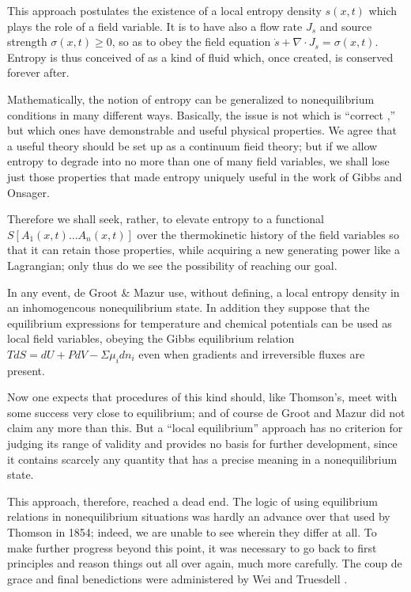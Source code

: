 \documentclass{article}
\begin{document}
This approach postulates the existence of a local entropy density $s(x, t)$ which plays the role of a field variable. It is to have also a flow rate $J_s$ and source strength $\sigma(x, t) \geqslant 0$, so as to obey the field equation $\dot{s}+\nabla \cdot J_s=\sigma(x, t)$. Entropy is thus conceived of as a kind of fluid which, once created, is conserved forever after.

Mathematically, the notion of entropy can be generalized to nonequilibrium conditions in many different ways. Basically, the issue is not which is ``correct ,'' but which ones have demonstrable and useful physical properties. We agree that a useful theory should be set up as a continuum fieid theory; but if we allow entropy to degrade into no more than one of many field variables, we shall lose just those properties that made entropy uniquely useful in the work of Gibbs and Onsager.

Therefore we shall seek, rather, to elevate entropy to a functional $S\left[A_1(x, t) \ldots A_n(x, t)\right]$ over the thermokinetic history of the field variables so that it can retain those properties, while acquiring a new generating power like a Lagrangian; only thus do we see the possibility of reaching our goal.

In any event, de Groot \& Mazur use, without defining, a local entropy density in an inhomogencous nonequilibrium state. In addition they suppose that the equilibrium expressions for temperature and chemical potentials can be used as local field variables, obeying the Gibbs equilibrium relation $T d S=d U+P d V-\Sigma \mu_i d n_i$ even when gradients and irreversible fluxes are present.

Now one expects that procedures of this kind should, like Thomson's, meet with some success very close to equilibrium; and of course de Groot and Mazur did not claim any more than this. But a ``local equilibrium'' approach has no criterion for judging its range of validity and provides no basis for further development, since it contains scarcely any quantity that has a precise meaning in a nonequilibrium state.

This approach, therefore, reached a dead end. The logic of using equilibrium relations in nonequilibrium situations was hardly an advance over that used by Thomson in 1854; indeed, we are unable to see wherein they differ at all. To make further progress beyond this point, it was necessary to go back to first principles and reason things out all over again, much more carefully. The coup de grace and final benedictions were administered by Wei \cite{wei1966} and Truesdell \cite{truesdell1969}.
\end{document}

